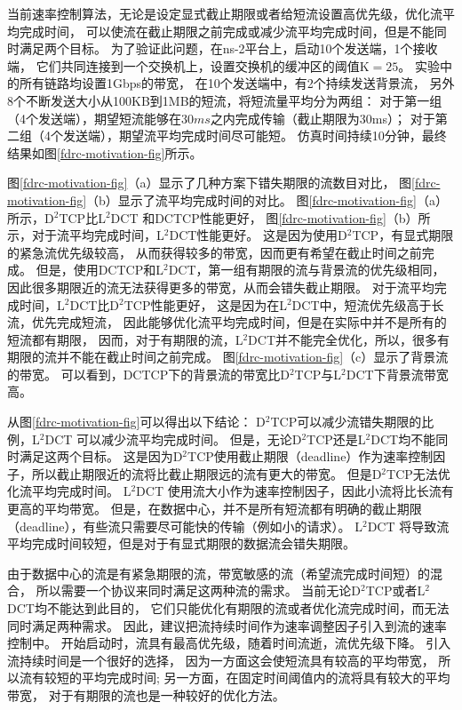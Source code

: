 当前速率控制算法，无论是设定显式截止期限或者给短流设置高优先级，优化流平均完成时间，
可以使流在截止期限之前完成或减少流平均完成时间，但是不能同时满足两个目标。
为了验证此问题，在ns-2平台上，启动10个发送端，1个接收端，
它们共同连接到一个交换机上，设置交换机的缓冲区的阈值K$=25$。
实验中的所有链路均设置1Gbps的带宽，
在10个发送端中，有2个持续发送背景流，
另外8个不断发送大小从100KB到1MB的短流，将短流量平均分为两组：
对于第一组（4个发送端），期望短流能够在$30ms$之内完成传输（截止期限为30ms）；
对于第二组（4个发送端），期望流平均完成时间尽可能短。
仿真时间持续10分钟，最终结果如图\ref{fdrc-motivation-fig}所示。

图\ref{fdrc-motivation-fig}（a）显示了几种方案下错失期限的流数目对比，
图\ref{fdrc-motivation-fig}（b）显示了流平均完成时间的对比。
图\ref{fdrc-motivation-fig}（a）所示，D$^2$TCP比L$^2$DCT 和DCTCP性能更好，
图\ref{fdrc-motivation-fig}（b）所示，对于流平均完成时间，L$^2$DCT性能更好。
这是因为使用D$^2$TCP，有显式期限的紧急流优先级较高，
从而获得较多的带宽，因而更有希望在截止时间之前完成。
但是，使用DCTCP和L$^2$DCT，第一组有期限的流与背景流的优先级相同，
因此很多期限近的流无法获得更多的带宽，从而会错失截止期限。
对于流平均完成时间，L$^2$DCT比D$^2$TCP性能更好，
这是因为在L$^2$DCT中，短流优先级高于长流，优先完成短流，
因此能够优化流平均完成时间，但是在实际中并不是所有的短流都有期限，
因而，对于有期限的流，L$^2$DCT并不能完全优化，所以，很多有期限的流并不能在截止时间之前完成。
图\ref{fdrc-motivation-fig}（c）显示了背景流的带宽。
可以看到，DCTCP下的背景流的带宽比D$^2$TCP与L$^2$DCT下背景流带宽高。


从图\ref{fdrc-motivation-fig}可以得出以下结论：
D$^2$TCP可以减少流错失期限的比例，L$^2$DCT 可以减少流平均完成时间。
但是，无论D$^2$TCP还是L$^2$DCT均不能同时满足这两个目标。
这是因为D$^2$TCP使用截止期限（deadline）作为速率控制因子，所以截止期限近的流将比截止期限远的流有更大的带宽。
但是D$^2$TCP无法优化流平均完成时间。
L$^2$DCT 使用流大小作为速率控制因子，因此小流将比长流有更高的平均带宽。
但是，在数据中心，并不是所有短流都有明确的截止期限（deadline），有些流只需要尽可能快的传输（例如小的请求）。
L$^2$DCT 将导致流平均完成时间较短，但是对于有显式期限的数据流会错失期限。

由于数据中心的流是有紧急期限的流，带宽敏感的流（希望流完成时间短）的混合，
所以需要一个协议来同时满足这两种流的需求。
当前无论D$^2$TCP或者L$^2$DCT均不能达到此目的，
它们只能优化有期限的流或者优化流完成时间，而无法同时满足两种需求。
因此，建议把流持续时间作为速率调整因子引入到流的速率控制中。
开始启动时，流具有最高优先级，随着时间流逝，流优先级下降。
引入流持续时间是一个很好的选择，
因为一方面这会使短流具有较高的平均带宽，
所以流有较短的平均完成时间;
另一方面，在固定时间阈值内的流将具有较大的平均带宽，
对于有期限的流也是一种较好的优化方法。


